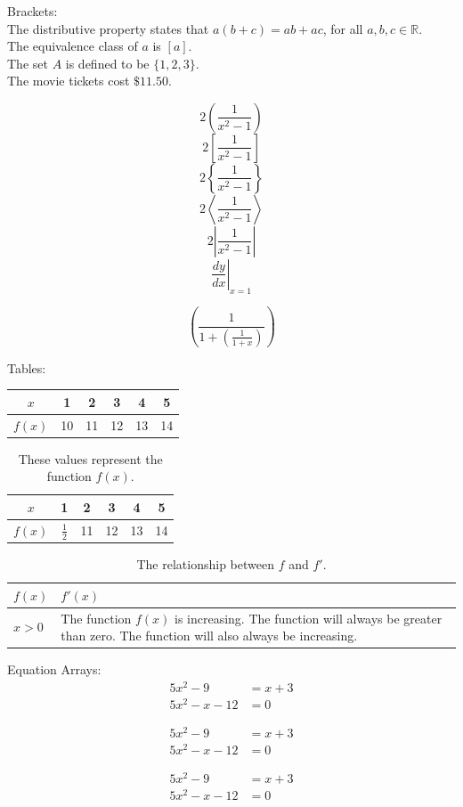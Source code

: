 \documentclass{article}
\begin{document}
Brackets:\\

The distributive property states that $a(b+c)=ab+ac$, for all $a, b, c \in \mathbb{R}$. \\[6pt]
The equivalence class of $a$ is $[a]$. \\[6pt]
The set $A$ is defined to be $\{1, 2, 3\}$. \\[6pt]
The movie tickets cost $\$11.50$.

$$2\left(\frac{1}{x^2-1}\right)$$
$$2\left[\frac{1}{x^2-1}\right]$$
$$2\left\{\frac{1}{x^2-1}\right\}$$
$$2\left \langle\frac{1}{x^2-1}\right \rangle$$
$$2\left | \frac{1}{x^2-1}\right |$$
$$\left.\frac{dy}{dx}\right|_{x=1}$$

$$\left( \frac{1}{1+ \left(\frac{1}{1+x}\right)}\right)$$


Tables:\\

\begin{tabular}{|c||c|c|c|c|c|}
\hline
$x$ & 1 & 2 & 3 & 4 & 5 \\ \hline
$f(x)$ & 10 & 11 & 12 & 13 & 14 \\ \hline
\end{tabular}

\vspace{1cm}


\begin{table}[H]
\centering
\def\arraystretch{1.5}
\begin{tabular}{|c||c|c|c|c|c|}
\hline
$x$ & 1 & 2 & 3 & 4 & 5 \\ \hline
$f(x)$ & $\frac{1}{2}$ & 11 & 12 & 13 & 14 \\ \hline
\end{tabular}
\caption{These values represent the function $f(x)$.}
\end{table}



\begin{table}[H]
\centering
\def\arraystretch{1.5}
\begin{tabular}{|l|p{3in}|}
\hline
$f(x)$ & $f'(x)$ \\ \hline
$x>0$ & The function $f(x)$ is increasing.  The function will always be greater than zero. The function will also always be increasing. \\ \hline
\end{tabular}
\caption{The relationship between $f$ and $f'$.}
\end{table}


Equation Arrays:\\

\begin{align}
5x^2-9&=x+3\\ %
5x^2-x-12&=0
\end{align}

\begin{align*}
5x^2-9&=x+3\\ %
5x^2-x-12&=0
\end{align*}

\begin{align}
5x^2-9&=x+3\\ %
5x^2-x-12&=0
\end{align}
\end{document}

